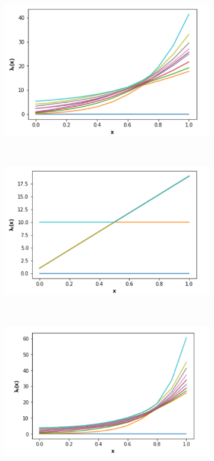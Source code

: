 \documentclass[10pt,a4paper]{article}
\begin{document}
\begin{figure}[!h]
	\centering
	\begin{subfigure}[b]{0.32\textwidth}
		\includegraphics[width=\textwidth]{images/Simple-network-eigenplot.png}
	\end{subfigure}~
	\begin{subfigure}[b]{0.32\textwidth}
		\includegraphics[width= \textwidth]{images/Star-network-eigenplot.png}
	\end{subfigure}~
	\begin{subfigure}[b]{0.32\textwidth}
		\includegraphics[width= \textwidth]{images/Path-network-eigenplot.png}

\end{subfigure}
\end{figure}
\end{document}
